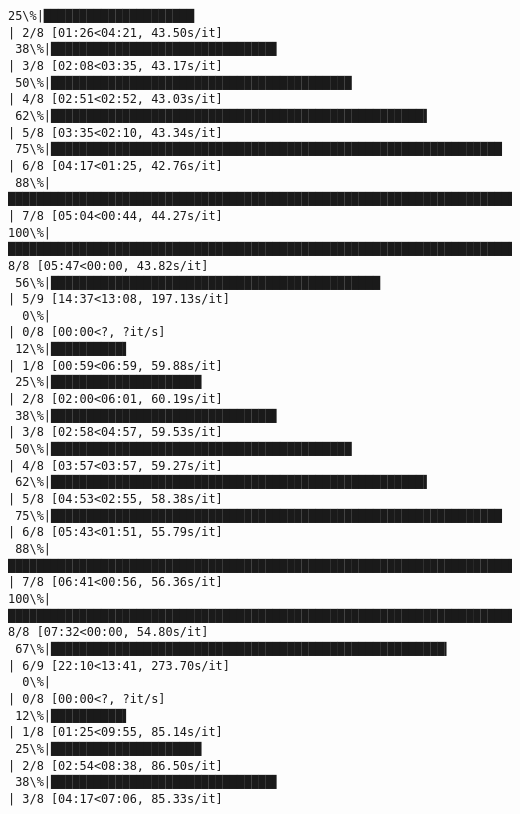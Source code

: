 \documentclass[11pt]{article}
\begin{document}
\begin{Verbatim}[commandchars=\\\{\}]
 25\%|█████████████████████                                                               | 2/8 [01:26<04:21, 43.50s/it]
 38\%|███████████████████████████████▌                                                    | 3/8 [02:08<03:35, 43.17s/it]
 50\%|██████████████████████████████████████████                                          | 4/8 [02:51<02:52, 43.03s/it]
 62\%|████████████████████████████████████████████████████▌                               | 5/8 [03:35<02:10, 43.34s/it]
 75\%|███████████████████████████████████████████████████████████████                     | 6/8 [04:17<01:25, 42.76s/it]
 88\%|█████████████████████████████████████████████████████████████████████████▌          | 7/8 [05:04<00:44, 44.27s/it]
100\%|████████████████████████████████████████████████████████████████████████████████████| 8/8 [05:47<00:00, 43.82s/it]
 56\%|██████████████████████████████████████████████                                     | 5/9 [14:37<13:08, 197.13s/it]
  0\%|                                                                                            | 0/8 [00:00<?, ?it/s]
 12\%|██████████▌                                                                         | 1/8 [00:59<06:59, 59.88s/it]
 25\%|█████████████████████                                                               | 2/8 [02:00<06:01, 60.19s/it]
 38\%|███████████████████████████████▌                                                    | 3/8 [02:58<04:57, 59.53s/it]
 50\%|██████████████████████████████████████████                                          | 4/8 [03:57<03:57, 59.27s/it]
 62\%|████████████████████████████████████████████████████▌                               | 5/8 [04:53<02:55, 58.38s/it]
 75\%|███████████████████████████████████████████████████████████████                     | 6/8 [05:43<01:51, 55.79s/it]
 88\%|█████████████████████████████████████████████████████████████████████████▌          | 7/8 [06:41<00:56, 56.36s/it]
100\%|████████████████████████████████████████████████████████████████████████████████████| 8/8 [07:32<00:00, 54.80s/it]
 67\%|███████████████████████████████████████████████████████▎                           | 6/9 [22:10<13:41, 273.70s/it]
  0\%|                                                                                            | 0/8 [00:00<?, ?it/s]
 12\%|██████████▌                                                                         | 1/8 [01:25<09:55, 85.14s/it]
 25\%|█████████████████████                                                               | 2/8 [02:54<08:38, 86.50s/it]
 38\%|███████████████████████████████▌                                                    | 3/8 [04:17<07:06, 85.33s/it]

\end{Verbatim}
\end{document}
